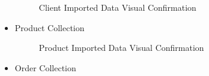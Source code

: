 \documentclass[a4Paper,12pt]{report}
\begin{document}
\begin{itemize}
\begin{figure}[H]
\caption{Client Imported Data Visual Confirmation}
\end{figure}
\item Product Collection
\begin{figure}[H]
\centering
{}
\caption{Product Imported Data Visual Confirmation}
\end{figure}
\item Order Collection
\begin{figure}[H]
\centering
{}

\end{figure}
\end{itemize}
\end{document}
